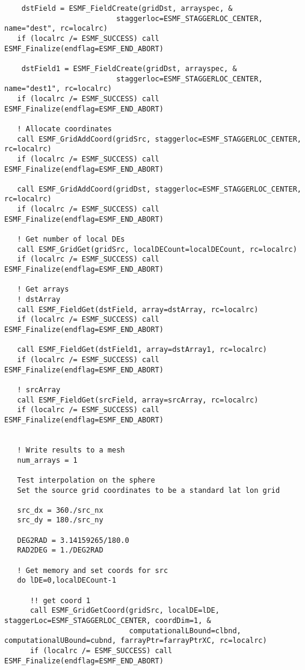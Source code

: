 \begin{verbatim}
    dstField = ESMF_FieldCreate(gridDst, arrayspec, &
                          staggerloc=ESMF_STAGGERLOC_CENTER, name="dest", rc=localrc)
   if (localrc /= ESMF_SUCCESS) call ESMF_Finalize(endflag=ESMF_END_ABORT)
 
    dstField1 = ESMF_FieldCreate(gridDst, arrayspec, &
                          staggerloc=ESMF_STAGGERLOC_CENTER, name="dest1", rc=localrc)
   if (localrc /= ESMF_SUCCESS) call ESMF_Finalize(endflag=ESMF_END_ABORT)
 
   ! Allocate coordinates
   call ESMF_GridAddCoord(gridSrc, staggerloc=ESMF_STAGGERLOC_CENTER, rc=localrc)
   if (localrc /= ESMF_SUCCESS) call ESMF_Finalize(endflag=ESMF_END_ABORT)
 
   call ESMF_GridAddCoord(gridDst, staggerloc=ESMF_STAGGERLOC_CENTER, rc=localrc)
   if (localrc /= ESMF_SUCCESS) call ESMF_Finalize(endflag=ESMF_END_ABORT)
 
   ! Get number of local DEs
   call ESMF_GridGet(gridSrc, localDECount=localDECount, rc=localrc)
   if (localrc /= ESMF_SUCCESS) call ESMF_Finalize(endflag=ESMF_END_ABORT)
 
   ! Get arrays
   ! dstArray
   call ESMF_FieldGet(dstField, array=dstArray, rc=localrc)
   if (localrc /= ESMF_SUCCESS) call ESMF_Finalize(endflag=ESMF_END_ABORT)
 
   call ESMF_FieldGet(dstField1, array=dstArray1, rc=localrc)
   if (localrc /= ESMF_SUCCESS) call ESMF_Finalize(endflag=ESMF_END_ABORT)
 
   ! srcArray
   call ESMF_FieldGet(srcField, array=srcArray, rc=localrc)
   if (localrc /= ESMF_SUCCESS) call ESMF_Finalize(endflag=ESMF_END_ABORT)
 
 
   ! Write results to a mesh
   num_arrays = 1
 
   Test interpolation on the sphere
   Set the source grid coordinates to be a standard lat lon grid
 
   src_dx = 360./src_nx
   src_dy = 180./src_ny
 
   DEG2RAD = 3.14159265/180.0
   RAD2DEG = 1./DEG2RAD
 
   ! Get memory and set coords for src
   do lDE=0,localDECount-1
  
      !! get coord 1
      call ESMF_GridGetCoord(gridSrc, localDE=lDE, staggerLoc=ESMF_STAGGERLOC_CENTER, coordDim=1, &
                             computationalLBound=clbnd, computationalUBound=cubnd, farrayPtr=farrayPtrXC, rc=localrc)
      if (localrc /= ESMF_SUCCESS) call ESMF_Finalize(endflag=ESMF_END_ABORT)
 

\end{verbatim}
